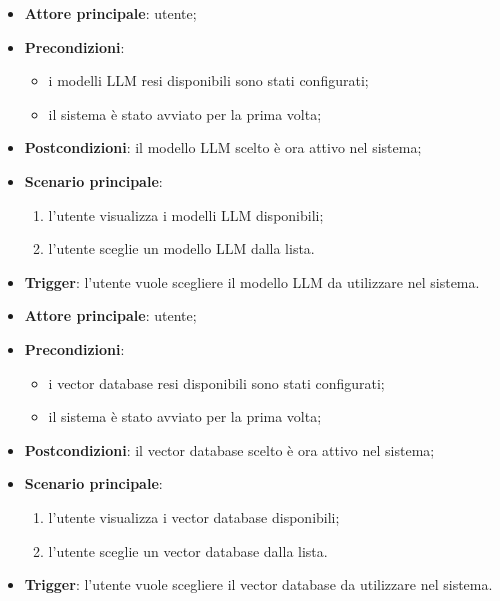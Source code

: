 \documentclass[10pt, a4paper]{article}
\begin{document}
    \begin{itemize}
        \item \textbf{Attore principale}: utente;
        \item \textbf{Precondizioni}:
        \begin{itemize}
            \item i modelli LLM resi disponibili sono stati configurati;
            \item il sistema è stato avviato per la prima volta;
        \end{itemize}
        \item \textbf{Postcondizioni}: il modello LLM scelto è ora attivo nel sistema;
        \item \textbf{Scenario principale}:
            \begin{enumerate}
                \item l’utente visualizza i modelli LLM disponibili;
                \item l’utente sceglie un modello LLM dalla lista.
            \end{enumerate}
        \item \textbf{Trigger}: l’utente vuole scegliere il modello LLM da utilizzare nel sistema.
    \end{itemize}

    \begin{itemize}
        \item \textbf{Attore principale}: utente;
        \item \textbf{Precondizioni}: 
        \begin{itemize}
            \item i vector database resi disponibili sono stati configurati;
            \item il sistema è stato avviato per la prima volta;
        \end{itemize}
        \item \textbf{Postcondizioni}: il vector database scelto è ora attivo nel sistema;
        \item \textbf{Scenario principale}:
            \begin{enumerate}
                \item l’utente visualizza i vector database disponibili;
                \item l’utente sceglie un vector database dalla lista.
            \end{enumerate}
        \item \textbf{Trigger}: l’utente vuole scegliere il vector database da utilizzare nel sistema.
    \end{itemize}
\end{document}
